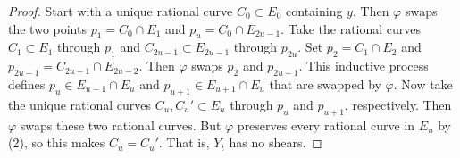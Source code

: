 \documentclass[reqno, letterpaper]{amsart}
\numberwithin{equation}{subsection}
\begin{document}
\begin{proof}
				Start with a unique rational curve $C_0 \subset E_0$ containing $y$. Then $\varphi$ swaps the two points $p_1 = C_0 \cap E_1$ and $p_u = C_0 \cap E_{2u-1}$. Take the rational curves $C_1 \subset E_1$ through $p_1$ and $C_{2u-1} \subset E_{2u-1}$ through $p_{2u}$. Set $p_2 = C_1 \cap E_2$ and $p_{2u-1} = C_{2u-1} \cap E_{2u-2}$. Then $\varphi$ swaps $p_2$ and $p_{2u-1}$. This inductive process defines $p_u \in E_{u-1} \cap E_u$ and $p_{u+1} \in E_{u+1} \cap E_u$ that are swapped by $\varphi$. Now take the unique rational curves $C_u, C_u' \subset E_u$ through $p_u$ and $p_{u+1}$, respectively. Then $\varphi$ swaps these two rational curves. But $\varphi$ preserves every rational curve in $E_u$ by (2), so this makes $C_u = C_u'$. That is, $Y_t$ has no shears.
			\end{proof}
			
\end{document}
